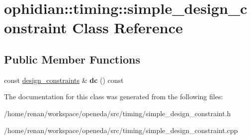 \hypertarget{classophidian_1_1timing_1_1simple__design__constraint}{\section{ophidian\-:\-:timing\-:\-:simple\-\_\-design\-\_\-constraint Class Reference}
\label{classophidian_1_1timing_1_1simple__design__constraint}
}
\subsection*{Public Member Functions}
\begin{DoxyCompactItemize}
\item 
\hypertarget{classophidian_1_1timing_1_1simple__design__constraint_addeba923b2f0e7ee29585c2d0800a06d}{const \hyperlink{structophidian_1_1timing_1_1design__constraints}{design\-\_\-constraints} \& {\bfseries dc} () const }\label{classophidian_1_1timing_1_1simple__design__constraint_addeba923b2f0e7ee29585c2d0800a06d}

\end{DoxyCompactItemize}


The documentation for this class was generated from the following files\-:\begin{DoxyCompactItemize}
\item 
/home/renan/workspace/openeda/src/timing/simple\-\_\-design\-\_\-constraint.\-h\item 
/home/renan/workspace/openeda/src/timing/simple\-\_\-design\-\_\-constraint.\-cpp\end{DoxyCompactItemize}
